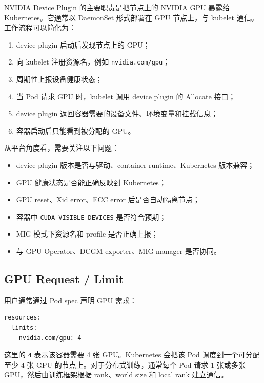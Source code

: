 NVIDIA Device Plugin 的主要职责是把节点上的 NVIDIA GPU 暴露给 Kubernetes。它通常以 DaemonSet 形式部署在 GPU 节点上，与 kubelet 通信。工作流程可以简化为：

\begin{enumerate}
  \item device plugin 启动后发现节点上的 GPU；
  \item 向 kubelet 注册资源名，例如 \texttt{nvidia.com/gpu}；
  \item 周期性上报设备健康状态；
  \item 当 Pod 请求 GPU 时，kubelet 调用 device plugin 的 Allocate 接口；
  \item device plugin 返回容器需要的设备文件、环境变量和挂载信息；
  \item 容器启动后只能看到被分配的 GPU。
\end{enumerate}

从平台角度看，需要关注以下问题：

\begin{itemize}
  \item device plugin 版本是否与驱动、container runtime、Kubernetes 版本兼容；
  \item GPU 健康状态是否能正确反映到 Kubernetes；
  \item GPU reset、Xid error、ECC error 后是否自动隔离节点；
  \item 容器中 \texttt{CUDA\_VISIBLE\_DEVICES} 是否符合预期；
  \item MIG 模式下资源名和 profile 是否正确上报；
  \item 与 GPU Operator、DCGM exporter、MIG manager 是否协同。
\end{itemize}

\subsection{GPU Request / Limit}
\label{subsec:gpu-request-limit}

用户通常通过 Pod spec 声明 GPU 需求：

\begin{lstlisting}[caption={在 Kubernetes 中请求 GPU 资源},label={lst:k8s-gpu-resource-request}]
resources:
  limits:
    nvidia.com/gpu: 4
\end{lstlisting}

这里的 \texttt{4} 表示该容器需要 4 张 GPU。Kubernetes 会把该 Pod 调度到一个可分配至少 4 张 GPU 的节点上。对于分布式训练，通常每个 Pod 请求 1 张或多张 GPU，然后由训练框架根据 rank、world size 和 local rank 建立通信。

